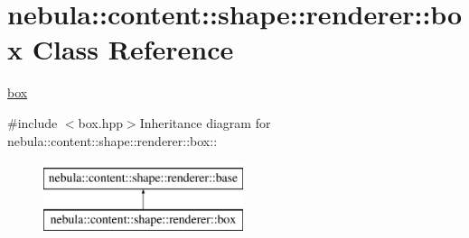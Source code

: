 \hypertarget{classnebula_1_1content_1_1shape_1_1renderer_1_1box}{
\section{nebula::content::shape::renderer::box Class Reference}
\label{classnebula_1_1content_1_1shape_1_1renderer_1_1box}
}


\hyperlink{classnebula_1_1content_1_1shape_1_1renderer_1_1box}{box}  


{\ttfamily \#include $<$box.hpp$>$}Inheritance diagram for nebula::content::shape::renderer::box::\begin{figure}[H]
\begin{center}
\leavevmode
\includegraphics[height=2cm]{classnebula_1_1content_1_1shape_1_1renderer_1_1box}
\end{center}
\end{figure}
